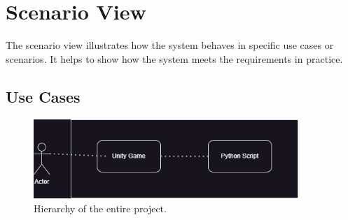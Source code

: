 \section{Scenario View}

The scenario view illustrates how the system behaves in specific use cases or scenarios. 
It helps to show how the system meets the requirements in practice.

\subsection{Use Cases}

\begin{figure}[htb]
    \centering
    \includegraphics[width=10cm]{Images/ProjectHier.png}
       \caption{Hierarchy of the entire project.}
           \label{Fig:TomTomHier}
\end{figure}